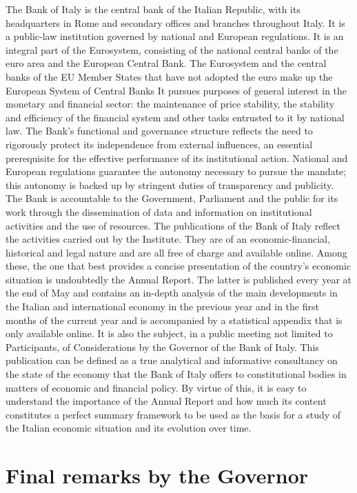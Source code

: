 \documentclass[
]{book}
\begin{document}
The Bank of Italy is the central bank of the Italian Republic, with its headquarters in Rome and secondary offices and branches throughout Italy. It is a public-law institution governed by national and European regulations. It is an integral part of the Eurosystem, consisting of the national central banks of the euro area and the European Central Bank.
The Eurosystem and the central banks of the EU Member States that have not adopted the euro make up the European System of Central Banks It pursues purposes of general interest in the monetary and financial sector: the maintenance of price stability, the stability and efficiency of the financial system and other tasks entrusted to it by national law.
The Bank's functional and governance structure reflects the need to rigorously protect its independence from external influences, an essential prerequisite for the effective performance of its institutional action. National and European regulations guarantee the autonomy necessary to pursue the mandate; this autonomy is backed up by stringent duties of transparency and publicity. The Bank is accountable to the Government, Parliament and the public for its work through the dissemination of data and information on institutional activities and the use of resources.
The publications of the Bank of Italy reflect the activities carried out by the Institute. They are of an economic-financial, historical and legal nature and are all free of charge and available online. Among these, the one that best provides a concise presentation of the country's economic situation is undoubtedly the Annual Report. The latter is published every year at the end of May and contains an in-depth analysis of the main developments in the Italian and international economy in the previous year and in the first months of the current year and is accompanied by a statistical appendix that is only available online. It is also the subject, in a public meeting not limited to Participants, of Considerations by the Governor of the Bank of Italy.
This publication can be defined as a true analytical and informative consultancy on the state of the economy that the Bank of Italy offers to constitutional bodies in matters of economic and financial policy. By virtue of this, it is easy to understand the importance of the Annual Report and how much its content constitutes a perfect summary framework to be used as the basis for a study of the Italian economic situation and its evolution over time.

\hypertarget{final-remarks-by-the-governor}{%
\section{Final remarks by the Governor}\label{final-remarks-by-the-governor}}
\end{document}
